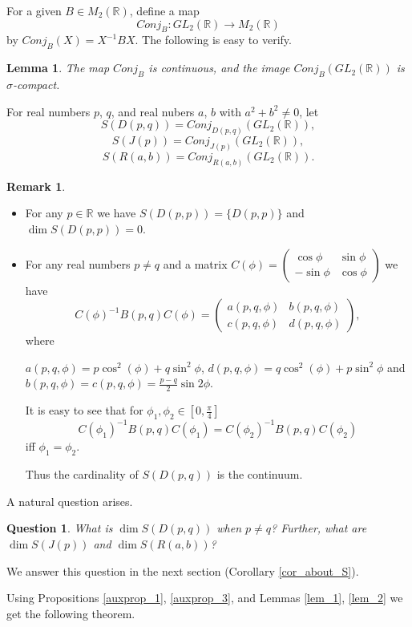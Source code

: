 \documentclass[12pt]{amsart}
\theoremstyle{plain}
\newtheorem{lem}[thm]{Lemma}
\newtheorem{question}[thm]{Question}
\theoremstyle{definition}
\newtheorem{remark}[thm]{Remark}
\begin{document}
For a given  $B\in M_2(\mathbb  R)$, define 
a map 
$$Conj_B\colon GL_2 (\mathbb R) \to M_2(\mathbb R)$$
by $Conj_B(X) = X^{-1} B X$. The following is easy to verify.

\begin{lem}\label{fibres} The map $Conj_B$ is continuous, and the image $Conj_B(GL_2 (\mathbb R))$ is $\sigma$-compact.
\end{lem}

For real numbers $p$, $q$, and real nubers $a$, $b$ with $a^2+b^2 \ne 0$,
let
$$S(D(p,q)) = Conj_{D(p,q)}(GL_2 (\mathbb R)),$$ 
$$S(J(p)) = Conj_{J(p)}(GL_2 (\mathbb R)),$$
$$S(R(a,b)) = Conj_{R(a,b)}(GL_2 (\mathbb R)).$$ 

\begin{remark} 
\begin{itemize}
\item[(i)]
For any $p \in \mathbb R$ we have $S(D(p,p)) = \{D(p,p)\}$ and 
$\dim S(D(p,p)) =0$. 
\item[(ii)] For any real numbers $p \ne q$ and a matrix 
$C(\phi) = \left(\begin{array}{rr}  \cos \phi & \sin \phi \\ -\sin \phi & \cos \phi  \end{array}\right)$
we have $$C(\phi)^{-1}B(p,q)C(\phi) = \left(\begin{array}{rr}  a(p,q, \phi) & b(p,q,\phi) \\ c(p,q,\phi) & d(p,q,\phi)  \end{array}\right),$$ where 

$a(p,q, \phi) = p \cos^2 (\phi) + q \sin^2 \phi$,
$d(p,q, \phi) = q \cos^2 (\phi) + p \sin^2 \phi$ and $b(p,q,\phi) = c(p,q,\phi) = \frac{p-q}{2} \sin 2 \phi$. 

It is easy to see that for $\phi_1, \phi_2 \in [0, \frac{\pi}{4}]$ 
$$C(\phi_1)^{-1}B(p,q)C(\phi_1) = C(\phi_2)^{-1}B(p,q)C(\phi_2)$$ iff $\phi_1 = \phi_2$.

Thus the cardinality of $S(D(p,q))$ is the
continuum.

\end{itemize}
\end{remark}

A natural question arises.
\begin{question} What is $\dim S(D(p,q))$ when $p \ne q$?
Further, what are $\dim S(J(p))$ and $\dim S(R(a,b))$?
\end{question}
We  answer this question in the next section (Corollary \ref{cor_about_S}).

Using Propositions \ref{auxprop_1}, \ref{auxprop_3}, and Lemmas \ref{lem_1}, \ref{lem_2} we get the following theorem.
\end{document}
